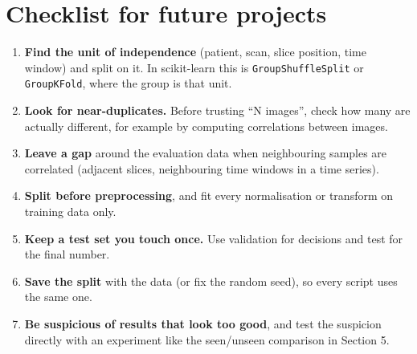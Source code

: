 \documentclass[11pt,a4paper]{article}
\begin{document}
\section{Checklist for future projects}

\begin{enumerate}[leftmargin=*]
  \item \textbf{Find the unit of independence} (patient, scan, slice position, time window) and split on it.
        In scikit-learn this is \texttt{GroupShuffleSplit} or \texttt{GroupKFold}, where the group is that unit.
  \item \textbf{Look for near-duplicates.} Before trusting ``N images'', check how many are actually different,
        for example by computing correlations between images.
  \item \textbf{Leave a gap} around the evaluation data when neighbouring samples are correlated (adjacent
        slices, neighbouring time windows in a time series).
  \item \textbf{Split before preprocessing}, and fit every normalisation or transform on training data only.
  \item \textbf{Keep a test set you touch once.} Use validation for decisions and test for the final number.
  \item \textbf{Save the split} with the data (or fix the random seed), so every script uses the same one.
  \item \textbf{Be suspicious of results that look too good}, and test the suspicion directly with an experiment
        like the seen/unseen comparison in Section 5.
\end{enumerate}
\end{document}
